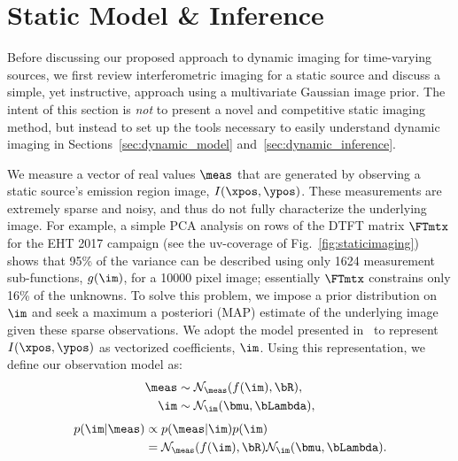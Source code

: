 \section{Static Model \& Inference}
\label{sec:static}



Before discussing our proposed approach to dynamic imaging for time-varying sources, we first review %
interferometric imaging for a static source and discuss a simple, yet instructive, approach using a multivariate Gaussian image prior. 
The intent of this section is {\it not} to present a novel and competitive static imaging method, but instead to set up the tools necessary to easily understand dynamic imaging in Sections~\ref{sec:dynamic_model} and~\ref{sec:dynamic_inference}.

We measure 
a vector of real values $\meas$ 
that are generated by observing a static source's emission region image, $I(\xpos, \ypos)$. These measurements are extremely sparse and noisy, and thus do not fully characterize the underlying image. 
For example, a simple PCA analysis on rows of the DTFT matrix $\FTmtx$ for the EHT 2017 campaign (see the uv-coverage of Fig.~\ref{fig:staticimaging}) shows that 95\% of the variance can be described using only 1624 measurement sub-functions, $g(\im)$, for a 10000 pixel image; essentially $\FTmtx$ constrains only 16\% of the unknowns. 
To solve this problem, we impose a prior distribution on $\im$ and seek a maximum a posteriori (MAP) estimate of the underlying image given these sparse observations. We adopt the model presented in~\cite{bouman2016computational} to represent $I(\xpos, \ypos)$ as vectorized coefficients, $\im$. Using this representation, we define our observation model as:
\begin{align}
\meas & \sim \mathcal{N}_{\meas}(f(\im), \bR), \\
\im & \sim \mathcal{N}_{\im}(\bmu, \bLambda),
\end{align}
\begin{align} 
\label{eq:bayes}
p(\im|\meas) & \propto p(\meas|\im) p(\im) \\
\notag & = \mathcal{N}_{\meas}(f(\im), \bR) \mathcal{N}_{\im}(\bmu, \bLambda).
\end{align}

